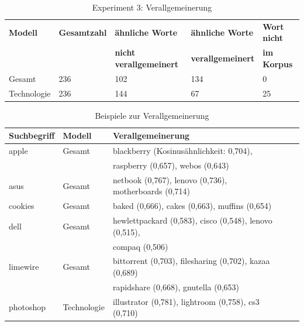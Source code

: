 \documentclass[12pt,a4paper]{report}
\begin{document}
\begin{table}[H]
\caption{Experiment 3: Verallgemeinerung}
\label{tab:Experiment3}
\begin{center}
\begin{tabular}{|l||l|l|l|l|}
\hline
\textbf{Modell} & \textbf{Gesamtzahl}& \textbf{ähnliche Worte} & \textbf{ähnliche Worte}  & \textbf{Wort nicht} \\
 &  & \textbf{nicht verallgemeinert} & \textbf{verallgemeinert} &\textbf{ im Korpus} \\

\hline
 Gesamt & 236 & 102 & 134 & 0  \\
 \hline
 Technologie & 236 & 144 & 67 & 25 \\
 \hline
 
\end{tabular}
\end{center}
\end{table}


		
		
\begin{table}[H]
\caption{Beispiele zur Verallgemeinerung}
\label{tab:bspVerallgemeinerung}
\begin{center}
\begin{tabular}{|l||l|l|l|l|}
\hline
\textbf{Suchbegriff} & \textbf{Modell} & \textbf{Verallgemeinerung}   \\
\hline
 apple & Gesamt & blackberry (Kosinusähnlichkeit: 0,704),\\
 	&	& raspberry (0,657), webos (0,643)\\
 \hline
 asus	   & Gesamt & netbook (0,767), lenovo (0,736), motherboards (0,714) \\
\hline
 cookies	& Gesamt& baked (0,666), cakes (0,663), muffins (0,654)\\
 	\hline
 dell	 & Gesamt & hewlettpackard (0,583), cisco (0,548), lenovo (0,515),\\
 && compaq (0,506) \\
 \hline
 limewire	& Gesamt& bittorrent (0,703), filesharing (0,702), kazaa (0,689)\\
 &&rapidshare (0,668), gnutella (0,653)\\
 	\hline
 	
 photoshop &	Technologie&	illustrator (0,781), lightroom (0,758), cs3 (0,710) \\
 	\hline
 	
 
\end{tabular}
\end{center}
\end{table}
\end{document}
